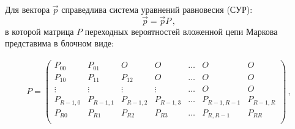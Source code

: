 \begin{multicols}{2}
Для вектора $\vec{p}$ справедлива система уравнений равновесия (СУР):
\begin{equation}
\label{ES}
\vec{p}=\vec{p}P\,,
\end{equation}
в которой матрица $P$ переходных вероятностей вложенной цепи Маркова
представима в блочном виде:
\end{multicols}

\begin{gather*}
P=
\begin{pmatrix}
P_{00}    & P_{01}    & O         & O         & \ldots & O           & O\\
P_{10}    & P_{11}    & P_{12}    & O         & \ldots & O           & O\\
\vdots    & \vdots    & \vdots    & \vdots    & \ldots & O           & O\\
P_{R-1,0} & P_{R-1,1} & P_{R-1,2} & P_{R-1,3} & \ldots & P_{R-1,R-1} & P_{R-1,R}\\
P_{R0}    & P_{R1}    & P_{R2}    & P_{R3}    & \ldots & P_{R,R-1}   & P_{RR}\\
\end{pmatrix}\,,
\end{gather*}

